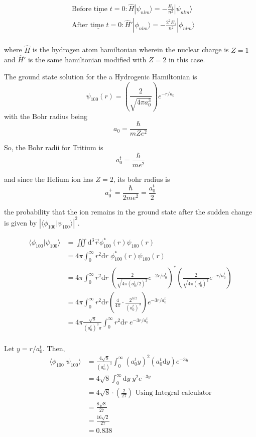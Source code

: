 \documentclass{article}
\newcommand{\ket}[1]{|#1 \rangle}
\newcommand{\inner}[2]{\langle #1 | #2 \rangle}
\begin{document}
\begin{align*}
  &\underline{\text{Before time $t = 0$}: } \hat{H}\ket{\psi_{nlm}} = -\frac{E_1}{n^2} \ket{\psi_{nlm}} \\
  &\underline{\text{After time $t = 0$}: } \hat{H}' \ket{\phi_{nlm}} = -\frac{2^2E_1}{n^2} \ket{\phi_{nlm}} \\
\end{align*}

\vskip 0.5cm
where $\hat{H}$ is the hydrogen atom hamiltonian wherein the nuclear charge is $Z = 1$ and $\hat{H}'$ is the same hamiltonian modified with $Z = 2$ in this case.

\vskip 0.5cm
The ground state solution for the a Hydrogenic Hamiltonian is 
\[ \psi_{100}(r) = \left(\frac{2}{\sqrt{4\pi a_0^3}}\right) e^{-r/a_0}  \]
with the Bohr radius being
\[ a_0 = \frac{\hbar}{mZe^2} \]

So, the Bohr radii for Tritium is 
\[ a_0^t = \frac{\hbar}{me^2} \]

and since the Helium ion has $Z = 2$, its bohr radius is
\[ a_0^{+} = \frac{\hbar}{2me^2} = \frac{a_0^t}{2}  \]

\vskip 0.5cm
the probability that the ion remains in the ground state after the sudden change is given by $\left|\inner{\phi_{100}}{\psi_{100}}\right|^2$.

\begin{align*}
  \inner{\phi_{100}}{\psi_{100}} &= \iiint \mathrm{d}^3\vec{r}  \phi_{100}^*(r) \psi_{100}(r) \\
  &= 4\pi \int_{0}^{\infty} r^2\mathrm{d}r \; \phi_{100}^*(r) \psi_{100}(r) \\
  &= 4\pi \int_{0}^{\infty} r^2\mathrm{d}r \; \left(\frac{2}{\sqrt{4\pi (a_0^t/2)^3}} e^{-2r/a_0^t}\right)^* \left( \frac{2}{\sqrt{4\pi (a_0^t)^3}} e^{-r/a_0^t} \right) \\
  &= 4\pi \int_{0}^{\infty} r^2\mathrm{d}r \left(\frac{4}{4\pi} \cdot \frac{2^{3/2}}{(a_0^t)^3}\right) e^{-3r/a_0^t} \\
  &= 4\pi \frac{\sqrt{8}}{(a_0^t)^3 \pi} \int_{0}^{\infty} r^2\mathrm{d}r \; e^{-3r/a_0^t} \\
\end{align*}

Let $y = r/a_0^t$. Then,
\begin{align*}
  \inner{\phi_{100}}{\psi_{100}} &= \frac{4\sqrt{8}}{(a_0^t)^3} \int_0^{\infty} (a_0^t y)^2 (a_0^t \mathrm{d}y) e^{-3y} \\
  &= 4 \sqrt{8} \int_{0}^{\infty} \mathrm{d}y \; y^2 e^{-3y} \\
  &= 4\sqrt{8} \cdot \left(\frac{2}{27}\right) \text{ Using Integral calculator} \\
  &= \frac{8 \sqrt{8}}{27} \\
  &= \frac{16 \sqrt{2}}{27} \\
  &= 0.838
\end{align*}
\end{document}
